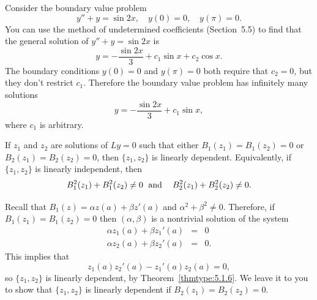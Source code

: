 \begin{example}
  \label{example:13.1.3} \rm Consider the boundary value problem
  \[
    y''+y=\sin2x,\quad y(0)=0,\quad y(\pi)=0.
  \]
  You can use the method of undetermined coefficients (Section~5.5) to find that the general
  solution of $y''+y=\sin2x$ is
  \[
    y=-\frac{\sin2x}{3}+c_{1}\sin x+c_{2}\cos x.
  \]
  The boundary conditions $y(0)=0$ and $y(\pi)=0$ both require that $c_{2}=0$, but they don't
  restrict $c_{1}$. Therefore the boundary value problem has infinitely many solutions
  \[
    y=-\frac{\sin2x}{3}+c_{1}\sin x,
  \]
  where $c_{1}$ is arbitrary.
\end{example}

\begin{theorem}
  \color{blue}
  \label{thmtype:13.1.1} If $z_{1}$ and $z_{2}$ are solutions of $Ly=0$ such that either
  $B_{1}(z_{1})=B_{1}(z_{2})=0$ or $B_{2}(z_{1})=B_{2}(z_{2})=0$, then $\{z_{1},z_{2}\}$ is linearly
  dependent. Equivalently, if\, $\{z_{1},z_{2}\}$ is linearly independent, then
  \[
    B_{1}^{2}(z_{1})+B_{1}^{2}(z_{2})\ne0\text{\; and\; \; }B_{2}^{2}(z_{1})+B_{2}^{2}(z_{2})\ne0.
  \]
\end{theorem}

\medskip
\proof Recall that $B_{1}(z)=\alpha z(a)+\beta z'(a)$ and $\alpha^{2}+\beta^{2}\ne0$. Therefore, if
$B_{1}(z_{1})=B_{1}(z_{2})=0$ then $(\alpha,\beta)$ is a nontrivial solution of the system
\begin{eqnarray*}
  \alpha z_{1}(a)+\beta z_{1}'(a) & = & 0 \\
  \alpha z_{2}(a)+\beta z_{2}'(a)  & = & 0.
\end{eqnarray*}
This implies that
\[
  z_{1}(a)z_{2}'(a)-z_{1}'(a)z_{2}(a)=0,
\]
so $\{z_{1},z_{2}\}$ is linearly dependent, by Theorem~\ref{thmtype:5.1.6}. We leave it to you to
show that $\{z_{1},z_{2}\}$ is linearly dependent if $B_{2}(z_{1})=B_{2}(z_{2})=0$.

